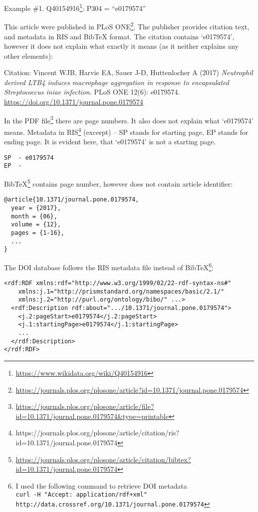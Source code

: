 Example \#1. Q40154916\footnote{\url{https://www.wikidata.org/wiki/Q40154916}}: P304 = ``e0179574''

This article were published in PLoS ONE\footnote{\url{https://journals.plos.org/plosone/article?id=10.1371/journal.pone.0179574}}. The publisher provides citation text, and metadata in RIS and BibTeX format. The citation contains `e0179574', however it does not explain what exactly it means (as it neither explains any other elements):

Citation: Vincent WJB, Harvie EA, Sauer J-D, Huttenlocher A (2017) \emph{Neutrophil derived LTB4 induces macrophage aggregation in response to encapsulated Streptococcus iniae infection.} PLoS ONE 12(6): e0179574. \url{https://doi.org/10.1371/journal.pone.0179574}

In the PDF file\footnote{\url{https://journals.plos.org/plosone/article/file?id=10.1371/journal.pone.0179574&type=printable}} there are page numbers. It also does not explain what `e0179574' means. Metadata in RIS\footnote{https://journals.plos.org/plosone/article/citation/ris?id=10.1371/journal.pone.0179574} (excerpt) -- SP stands for starting page, EP stands for ending page. It is evident here, that `e0179574' is not a starting page. 
\begin{lstlisting}
SP  - e0179574
EP  - 
\end{lstlisting}

BibTeX\footnote{\url{https://journals.plos.org/plosone/article/citation/bibtex?id=10.1371/journal.pone.0179574}} contains page number, however does not contain article identifier:
\begin{lstlisting}
@article{10.1371/journal.pone.0179574,
  year = {2017},
  month = {06},
  volume = {12},
  pages = {1-16},
  ...
}
\end{lstlisting}

The DOI database follows the RIS metadata file instead of BibTeX\footnote{I used the following command to retrieve DOI metadata\\
\texttt{curl -H "Accept: application/rdf+xml" \\ http://data.crossref.org/10.1371/journal.pone.0179574}}:

\begin{lstlisting}
<rdf:RDF xmlns:rdf="http://www.w3.org/1999/02/22-rdf-syntax-ns#"
    xmlns:j.1="http://prismstandard.org/namespaces/basic/2.1/"
    xmlns:j.2="http://purl.org/ontology/bibo/" ...>
  <rdf:Description rdf:about=".../10.1371/journal.pone.0179574">
    <j.2:pageStart>e0179574</j.2:pageStart>
    <j.1:startingPage>e0179574</j.1:startingPage>
    ...
  </rdf:Description>
</rdf:RDF>
\end{lstlisting}

